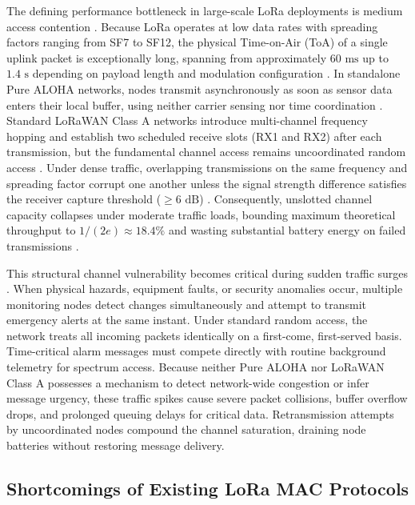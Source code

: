 \documentclass[preprint,review,12pt]{elsarticle}
\begin{document}
The defining performance bottleneck in large-scale LoRa deployments is medium access contention \cite{bor2016lora}. Because LoRa operates at low data rates with spreading factors ranging from SF7 to SF12, the physical Time-on-Air (ToA) of a single uplink packet is exceptionally long, spanning from approximately $60\text{ ms}$ up to $1.4\text{ s}$ depending on payload length and modulation configuration \cite{semtech2020sx1276}. In standalone Pure ALOHA networks, nodes transmit asynchronously as soon as sensor data enters their local buffer, using neither carrier sensing nor time coordination \cite{abramson1970aloha, roberts1975aloha}. Standard LoRaWAN Class A networks introduce multi-channel frequency hopping and establish two scheduled receive slots (RX1 and RX2) after each transmission, but the fundamental channel access remains uncoordinated random access \cite{semtech2020sx1276}. Under dense traffic, overlapping transmissions on the same frequency and spreading factor corrupt one another unless the signal strength difference satisfies the receiver capture threshold ($\ge 6\text{ dB}$) \cite{bankov2017mathematical, croce2018impact}. Consequently, unslotted channel capacity collapses under moderate traffic loads, bounding maximum theoretical throughput to $1/(2e) \approx 18.4\%$ and wasting substantial battery energy on failed transmissions \cite{roberts1975aloha}.

This structural channel vulnerability becomes critical during sudden traffic surges \cite{kolias2017ddos, butun2018security}. When physical hazards, equipment faults, or security anomalies occur, multiple monitoring nodes detect changes simultaneously and attempt to transmit emergency alerts at the same instant. Under standard random access, the network treats all incoming packets identically on a first-come, first-served basis. Time-critical alarm messages must compete directly with routine background telemetry for spectrum access. Because neither Pure ALOHA nor LoRaWAN Class A possesses a mechanism to detect network-wide congestion or infer message urgency, these traffic spikes cause severe packet collisions, buffer overflow drops, and prolonged queuing delays for critical data. Retransmission attempts by uncoordinated nodes compound the channel saturation, draining node batteries without restoring message delivery.

\subsection{Shortcomings of Existing LoRa MAC Protocols}
\end{document}
